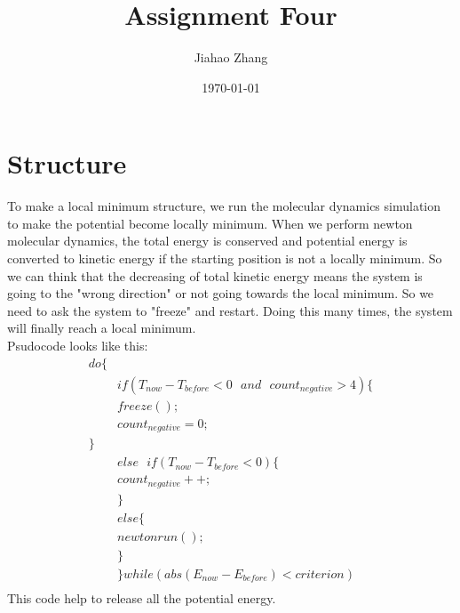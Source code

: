 \documentclass[letterpaper]{article}
\title{Assignment Four}
\author{Jiahao Zhang}
\date{\today}
\begin{document}
	\maketitle
	\section{Structure}
	To make a local minimum structure, we run the molecular dynamics simulation to make the potential become locally minimum. When we perform newton molecular dynamics, the total energy is conserved and potential energy is converted to kinetic energy if the starting position is not a locally minimum. So we can think that the decreasing of total kinetic energy means the system is going to the "wrong direction" or not going towards the local minimum. So we need to ask the system to "freeze" and restart. Doing this many times, the system will finally reach a local minimum.\\
	Psudocode looks like this:
	\begin{align*}
		do\{&\\
			&if(T_{now}-T_{before}<0\text{ } and\text{ } count_{negative}>4)\{\\
				&freeze();\\
				&count_{negative}=0;\\
			\}\\
			&else\text{ } if(T_{now}-T_{before}<0)\{\\
			&count_{negative}++;\\
			&\}\\
			&else\{\\
			&	newtonrun();\\
			&	\}\\
			&\}while(abs(E_{now}-E_{before})<criterion)\\
	\end{align*}
	This code help to release all the potential energy.
\end{document}

